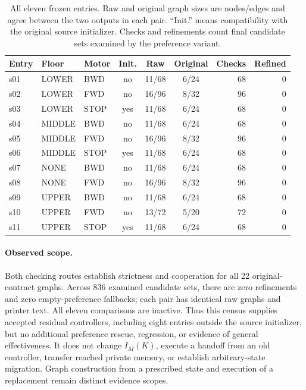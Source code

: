 \begin{table}[htbp]
\centering
\caption{All eleven frozen entries. Raw and original graph sizes are
nodes/edges and agree between the two outputs in each pair. ``Init.''
means compatibility with the original source initializer. Checks and
refinements count final candidate sets examined by the preference variant.}
\label{tab:residual-elevator}
\begin{tabular}{@{}lllcccrr@{}}
\toprule
Entry & Floor & Motor & Init. & Raw & Original & Checks & Refined\\
\midrule
s01 & LOWER  & BWD  & no  & 11/68 & 6/24 & 68 & 0\\
s02 & LOWER  & FWD  & no  & 16/96 & 8/32 & 96 & 0\\
s03 & LOWER  & STOP & yes & 11/68 & 6/24 & 68 & 0\\
s04 & MIDDLE & BWD  & no  & 11/68 & 6/24 & 68 & 0\\
s05 & MIDDLE & FWD  & no  & 16/96 & 8/32 & 96 & 0\\
s06 & MIDDLE & STOP & yes & 11/68 & 6/24 & 68 & 0\\
s07 & NONE   & BWD  & no  & 11/68 & 6/24 & 68 & 0\\
s08 & NONE   & FWD  & no  & 16/96 & 8/32 & 96 & 0\\
s09 & UPPER  & BWD  & no  & 11/68 & 6/24 & 68 & 0\\
s10 & UPPER  & FWD  & no  & 13/72 & 5/20 & 72 & 0\\
s11 & UPPER  & STOP & yes & 11/68 & 6/24 & 68 & 0\\
\bottomrule
\end{tabular}
\end{table}

\paragraph{Observed scope.}
Both checking routes establish strictness and cooperation for all 22
original-contract graphs. Across 836 examined candidate sets, there are
zero refinements and zero empty-preference fallbacks; each pair has
identical raw graphs and printer text. All eleven comparisons are inactive.
Thus this census supplies accepted residual controllers, including eight
entries outside the source initializer, but no additional preference
rescue, regression, or evidence of general effectiveness. It does not
change $I_M(K)$, execute a handoff from an old controller, transfer reached
private memory, or establish arbitrary-state migration. Graph construction
from a prescribed state and execution of a replacement remain distinct
evidence scopes.

